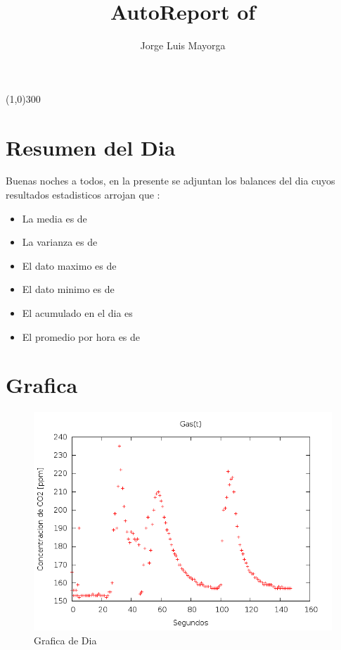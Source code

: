 \documentclass{article}
\begin{document}
\title{AutoReport of \dataname}
\author{Jorge Luis Mayorga}
\date{\datadate}
\maketitle
\line(1,0){300} 

\section{Resumen del Dia}
Buenas noches a todos, en la presente se adjuntan los balances del dia \datadate           cuyos resultados estadisticos arrojan que :
\begin{itemize}
\item La media es de \datamean
\item La varianza es de \datavar
\item El dato maximo es de \datamax
\item El dato minimo es de \datamin
\item El acumulado en el dia es \datasum
\item El promedio por hora es de \datahouraverage
\end{itemize}

\section{Grafica}

\begin{figure}
  \centering
    \includegraphics[width=1\columnwidth]{Plot_data.png}
  \caption{Grafica de Dia \datadate}
  \label{fig:plot}
\end{figure}
\end{document}
